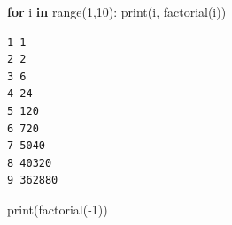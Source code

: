\documentclass[
  spanish,
  letterpaper,
]{scrbook}
\newenvironment{Shaded}{\begin{snugshade}}{\end{snugshade}}
\newcommand{\BuiltInTok}[1]{\textcolor[rgb]{0.00,0.23,0.31}{#1}}
\newcommand{\ControlFlowTok}[1]{\textcolor[rgb]{0.00,0.23,0.31}{\textbf{#1}}}
\newcommand{\DecValTok}[1]{\textcolor[rgb]{0.68,0.00,0.00}{#1}}
\newcommand{\KeywordTok}[1]{\textcolor[rgb]{0.00,0.23,0.31}{\textbf{#1}}}
\newcommand{\NormalTok}[1]{\textcolor[rgb]{0.00,0.23,0.31}{#1}}
\newcommand{\OperatorTok}[1]{\textcolor[rgb]{0.37,0.37,0.37}{#1}}
\theoremstyle{definition}
\theoremstyle{remark}
\begin{document}
\begin{Shaded}
\begin{Highlighting}[]
\ControlFlowTok{for}\NormalTok{ i }\KeywordTok{in} \BuiltInTok{range}\NormalTok{(}\DecValTok{1}\NormalTok{,}\DecValTok{10}\NormalTok{):}
    \BuiltInTok{print}\NormalTok{(i, factorial(i))}
\end{Highlighting}
\end{Shaded}

\begin{verbatim}
1 1
2 2
3 6
4 24
5 120
6 720
7 5040
8 40320
9 362880
\end{verbatim}

\begin{Shaded}
\begin{Highlighting}[]
\BuiltInTok{print}\NormalTok{(factorial(}\OperatorTok{{-}}\DecValTok{1}\NormalTok{))}
\end{Highlighting}
\end{Shaded}
\end{document}
